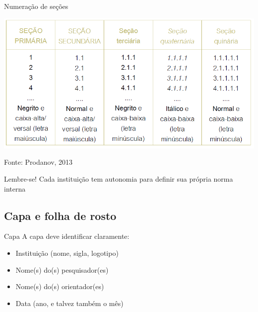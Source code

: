 \documentclass{beamer}
\begin{document}
\begin{frame}{Numeração de seções}
  \begin{center}
    \includegraphics[width=\textwidth]{ProjetoII/secoes}
  \end{center}

  \vfill
  Fonte: Prodanov, 2013
\end{frame}

\begin{frame}{}
  \begin{block}{Lembre-se!}
    Cada instituição tem autonomia para definir sua própria norma interna
  \end{block}
\end{frame}

\subsection{Capa e folha de rosto}

\begin{frame}{Capa}
A capa deve identificar claramente:
  \begin{itemize}
  \item Instituição (nome, sigla, logotipo)
  \item Nome(s) do(s) pesquisador(es)
  \item Nome(s) do(s) orientador(es)
  \item Data (ano, e talvez também o mês)
  \end{itemize}
\end{frame}
\end{document}
